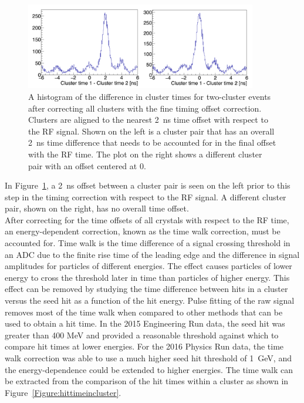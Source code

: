 \begin{figure}[htb]
  \centering
      \includegraphics[width=0.9\textwidth]{pics/performance/2clusteroffset.png}
  \caption[Time difference between two clusters after fine offset time correction]{A histogram of the difference in cluster times for two-cluster events after correcting all clusters with the fine timing offset correction. Clusters are aligned to the nearest 2~ns time offset with respect to the RF signal. Shown on the left is a cluster pair that has an overall 2~ns time difference that needs to be accounted for in the final offset with the RF time. The plot on the right shows a different cluster pair with an offset centered at 0.}
  \label{Figure:2clusoffset}
\end{figure}

In Figure~\ref{Figure:2clusoffset}, a 2~ns offset between a cluster pair is seen on the left prior to this step in the timing correction with respect to the RF signal. A different cluster pair, shown on the right, has no overall time offset. \\
\indent After correcting for the time offsets of all crystals with respect to the RF time, an energy-dependent correction, known as the time walk correction, must be accounted for. Time walk is the time difference of a signal crossing threshold in an ADC due to the finite rise time of the leading edge and the difference in signal amplitudes for particles of different energies. The effect causes particles of lower energy to cross the threshold later in time than particles of higher energy. This effect can be removed by studying the time difference between hits in a cluster versus the seed hit as a function of the hit energy. Pulse fitting of the raw signal removes most of the time walk when compared to other methods that can be used to obtain a hit time. In the 2015 Engineering Run data, the seed hit was greater than 400 MeV and provided a reasonable threshold against which to compare hit times at lower energies. For the 2016 Physics Run data, the time walk correction was able to use a much higher seed hit threshold of 1~GeV, and the energy-dependence could be extended to higher energies. The time walk can be extracted from the comparison of the hit times within a cluster as shown in Figure~\ref{Figure:hittimeincluster}.

